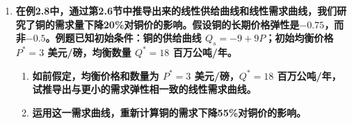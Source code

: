 \begin{enumerate}[label=\textbf{\arabic*.}, leftmargin=*]
			 \textbf{(b)1998年，美国人共消费了235亿包香烟，每包零售价为2美元。1998—2010年，香烟消费下降的部分原因是人们更多地认识到吸烟对健康的危害，部分原因是价格的上升。假设消费下降的所有原因都是价格上升，你可以推断出需求的价格弹性具有什么特征吗？}
			
			若假定消费下降完全由价格上涨导致，则意味着需求曲线未发生位移，观测到的变动完全是沿着同一条需求曲线的点移动。基于此假设，我们计算需求弧弹性：

				$$ E_d = \frac{\Delta Q}{\Delta P} \cdot \frac{(P_1 + P_2)/2}{(Q_1 + Q_2)/2} $$
			
			已知 1998 年数据为 $(P_1, Q_1) = (2, 235)$，2010 年数据为 $(P_2, Q_2) = (5, 157.5)$：
			$$ \Delta Q = 157.5 - 235 = -77.5, \quad \Delta P = 5 - 2 = 3 $$
			代入弧弹性公式：
			$$ \begin{aligned}
				E_d &= \frac{-77.5}{3} \cdot \frac{(2 + 5)/2}{(235 + 157.5)/2} \\
				& \approx -0.46
			\end{aligned} $$
			
			根据计算结果，可以推断该需求具有以下特征：
			\begin{enumerate}
				\item \textbf{需求缺乏弹性}：由于 $|E_d| \approx 0.46 < 1$，香烟需求表现为缺乏弹性。这意味着价格大幅上升仅引起消费量较小幅度的下降。
				\item \textbf{刚需属性}：长期来看，即便将所有消费降幅归结为价格因素，弹性系数依旧偏低。这印证了香烟作为成瘾性商品，消费者对其价格敏感度较低。
				\item \textbf{长期与短期的差异}：对比 2010 年的短期点弹性（$-0.4$）与该长期弧弹性（约 $-0.46$），可以看出随着时间推移，消费者通过调整习惯等方式，对价格的反应会比短期稍微灵敏一些。
			\end{enumerate}

			\item \textbf{在例2.8中，通过第2.6节中推导出来的线性供给曲线和线性需求曲线，我们研究了铜的需求量下降20\%对铜价的影响。假设铜的长期价格弹性是$-0.75$，而非$-0.5$。例题已知初始条件：铜的供给曲线 $Q_s = -9 + 9P$；初始均衡价格 $P^* = 3$ 美元/磅，均衡数量 $Q^* = 18$ 百万公吨/年。}
			
			\begin{enumerate}[label=\textbf{\alph*.}, leftmargin=2em]
				\item \textbf{如前假定，均衡价格和数量为 $P^* = 3$ 美元/磅，$Q^* = 18$ 百万公吨/年，试推导出与更小的需求弹性相一致的线性需求曲线。}
				\item \textbf{运用这一需求曲线，重新计算铜的需求下降55\%对铜价的影响。}
			\end{enumerate}
			

\end{enumerate}
